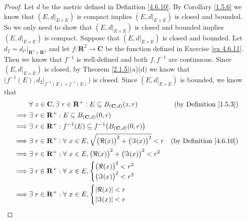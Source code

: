 \begin{proof}
    Let \(d\) be the metric defined in Definition \ref{4.6.10}.
    By Corollary \ref{1.5.6} we know that \((E, d|_{E \times E})\) is compact implies \((E, d|_{E \times E})\) is closed and bounded.
    So we only need to show that \((E, d|_{E \times E})\) is closed and bounded implies \((E, d|_{E \times E})\) is compact.
    Suppose that \((E, d|_{E \times E})\) is closed and bounded.
    Let \(d_2 = d_{l^1}|_{\mathbf{R}^2 \times \mathbf{R}^2}\) and let \(f : \mathbf{R}^2 \to \mathbf{C}\) be the function defined in Exercise \ref{ex 4.6.11}.
    Then we know that \(f^{-1}\) is well-defined and both \(f, f^{-1}\) are continuous.
    Since \((E, d|_{E \times E})\) is closed, by Theorem \ref{2.1.5}(a)(d) we know that \(\big(f^{-1}(E), d_2|_{f^{-1}(E) \times f^{-1}(E)}\big)\) is closed.
    Since \((E, d|_{E \times E})\) is bounded, we know that
    \begin{align*}
                 & \forall\ z \in \mathbf{C}, \exists\ r \in \mathbf{R}^+ : E \subseteq B_{(\mathbf{C}, d)}(z, r)     & \text{(by Definition \ref{1.5.3})}  \\
        \implies & \exists\ r \in \mathbf{R}^+ : E \subseteq B_{(\mathbf{C}, d)}(0, r)                                                                      \\
        \implies & \exists\ r \in \mathbf{R}^+ : f^{-1}(E) \subseteq f^{-1}\big(B_{(\mathbf{C}, d)}(0, r)\big)                                              \\
        \implies & \exists\ r \in \mathbf{R}^+ : \forall\ x \in E, \sqrt{\big(\Re(x)\big)^2 + \big(\Im(x)\big)^2} < r & \text{(by Definition \ref{4.6.10})} \\
        \implies & \exists\ r \in \mathbf{R}^+ : \forall\ x \in E, \big(\Re(x)\big)^2 + \big(\Im(x)\big)^2 < r^2                                            \\
        \implies & \exists\ r \in \mathbf{R}^+ : \forall\ x \in E, \begin{cases}
            \big(\Re(x)\big)^2 < r^2 \\
            \big(\Im(x)\big)^2 < r^2
        \end{cases}                                                              \\
        \implies & \exists\ r \in \mathbf{R}^+ : \forall\ x \in E, \begin{cases}
            \abs*{\Re(x)} < r \\
            \abs*{\Im(x)} < r
        \end{cases}                                                              \\

\end{align*}
\end{proof}
